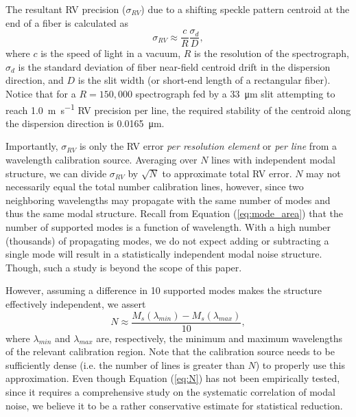 The resultant RV precision ($\sigma_{RV}$) due to a shifting speckle pattern centroid at the end of a fiber is calculated as
\begin{equation}
\sigma_{RV} \approx \frac{c}{R} \frac{\sigma_d}{D},
\label{eq:rv_error}
\end{equation}
where $c$ is the speed of light in a vacuum, $R$ is the resolution of the spectrograph, $\sigma_d$ is the standard deviation of fiber near-field centroid drift in the dispersion direction, and $D$ is the slit width (or short-end length of a rectangular fiber). Notice that for a $R=150,000$ spectrograph fed by a \SI{33}{\micro\meter} slit attempting to reach \SI{1.0}{\meter\per\second} RV precision per line, the required stability of the centroid along the dispersion direction is \SI{0.0165}{\micro\meter}.

Importantly, $\sigma_{RV}$ is only the RV error \textit{per resolution element} or \textit{per line} from a wavelength calibration source. Averaging over $N$ lines with independent modal structure, we can divide $\sigma_{RV}$ by $\sqrt{N}$ to approximate total RV error. $N$ may not necessarily equal the total number calibration lines, however, since two neighboring wavelengths may propagate with the same number of modes and thus the same modal structure. Recall from Equation (\ref{eq:mode_area}) that the number of supported modes is a function of wavelength. With a high number (thousands) of propagating modes, we do not expect adding or subtracting a single mode will result in a statistically independent modal noise structure. Though, such a study is beyond the scope of this paper.

However, assuming a difference in 10 supported modes makes the structure effectively independent, we assert
\begin{equation}
N \approx \frac{M_s(\lambda_{min}) - M_s(\lambda_{max})}{10},
\label{eq:N}
\end{equation}
where $\lambda_{min}$ and $\lambda_{max}$ are, respectively, the minimum and maximum wavelengths of the relevant calibration region. Note that the calibration source needs to be sufficiently dense (i.e. the number of lines is greater than $N$) to properly use this approximation. Even though Equation (\ref{eq:N}) has not been empirically tested, since it requires a comprehensive study on the systematic correlation of modal noise, we believe it to be a rather conservative estimate for statistical reduction.

